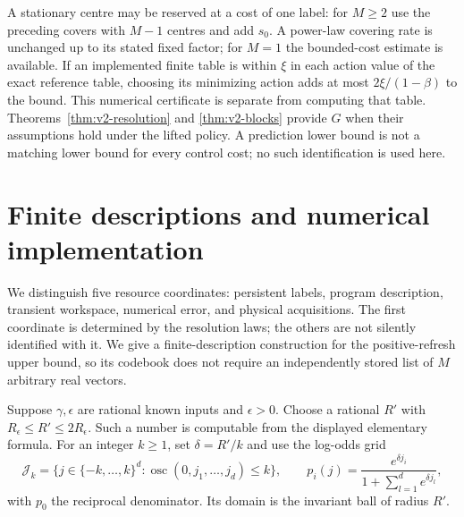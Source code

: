 A stationary centre may be reserved at a cost of one label: for $M\ge2$
use the preceding covers with $M-1$ centres and add $s_0$. A power-law
covering rate is unchanged up to its stated fixed factor; for $M=1$ the
bounded-cost estimate is available. If an implemented finite table is
within $\xi$ in each action value of the exact reference table, choosing
its minimizing action adds at most $2\xi/(1-\beta)$ to the bound.
This numerical certificate is separate from computing that table.
Theorems~\ref{thm:v2-resolution} and \ref{thm:v2-blocks} provide $G$
when their assumptions hold under the lifted policy. A prediction lower
bound is not a matching lower bound for every control cost; no such
identification is used here.

\section{Finite descriptions and numerical implementation}
\label{sec:v2-resources}
We distinguish five resource coordinates: persistent labels, program
description, transient workspace, numerical error, and physical acquisitions.
The first coordinate is determined by the resolution laws; the others
are not silently identified with it. We give a finite-description
construction for the positive-refresh upper bound, so its codebook does
not require an independently stored list of $M$ arbitrary real vectors.

Suppose $\gamma,\epsilon$ are rational known inputs and $\epsilon>0$.
Choose a rational $R'$ with $R_\epsilon\le R'\le2R_\epsilon$.
Such a number is computable from the displayed elementary formula.
For an integer $k\ge1$, set $\delta=R'/k$ and use the log-odds grid
\begin{equation}\label{eq:v2-grid}
 \mathcal J_k=\{j\in\{-k,\ldots,k\}^d:
       \operatorname{osc}(0,j_1,\ldots,j_d)\le k\},\qquad
 p_i(j)=\frac{e^{\delta j_i}}{1+\sum_{l=1}^d e^{\delta j_l}},
\end{equation}
with $p_0$ the reciprocal denominator. Its domain is the invariant ball
of radius $R'$.

